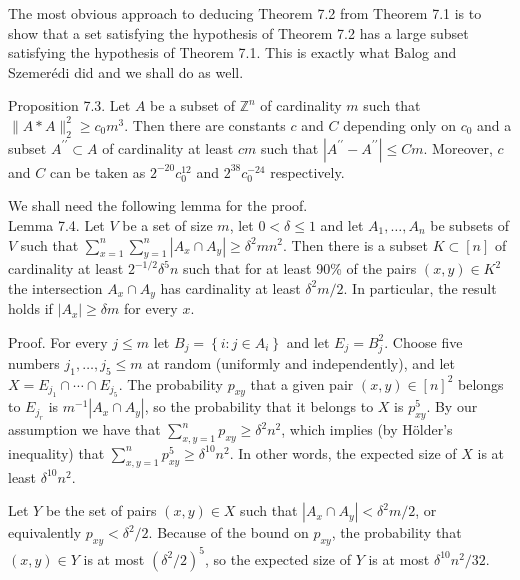 \documentclass[10pt]{article}
\begin{document}
The most obvious approach to deducing Theorem 7.2 from Theorem 7.1 is to show that a set satisfying the hypothesis of Theorem 7.2 has a large subset satisfying the hypothesis of Theorem 7.1. This is exactly what Balog and Szemerédi did and we shall do as well.

Proposition 7.3. Let $A$ be a subset of $\mathbb{Z}^{n}$ of cardinality $m$ such that $\|A * A\|_{2}^{2} \geqslant c_{0} m^{3}$. Then there are constants $c$ and $C$ depending only on $c_{0}$ and a subset $A^{\prime \prime} \subset A$ of cardinality at least $c m$ such that $\left|A^{\prime \prime}-A^{\prime \prime}\right| \leqslant C m$. Moreover, $c$ and $C$ can be taken as $2^{-20} c_{0}^{12}$ and $2^{38} c_{0}^{-24}$ respectively.

We shall need the following lemma for the proof.\\
Lemma 7.4. Let $V$ be a set of size $m$, let $0<\delta\leq 1$ and let $A_{1}, \ldots, A_{n}$ be subsets of $V$ such that $\sum_{x=1}^{n} \sum_{y=1}^{n}\left|A_{x} \cap A_{y}\right| \geqslant \delta^{2} m n^{2}$. Then there is a subset $K \subset[n]$ of cardinality at least $2^{-1 / 2} \delta^{5} n$ such that for at least 90\% of the pairs $(x, y) \in K^{2}$ the intersection $A_{x} \cap A_{y}$ has cardinality at least $\delta^{2} m / 2$. In particular, the result holds if $\left|A_{x}\right| \geqslant \delta m$ for every $x$.

Proof. For every $j \leqslant m$ let $B_{j}=\left\{i: j \in A_{i}\right\}$ and let $E_{j}=B_{j}^{2}$. Choose five numbers $j_{1}, \ldots, j_{5} \leqslant m$ at random (uniformly and independently), and let $X=E_{j_{1}} \cap \cdots \cap E_{j_{5}}$. The probability $p_{x y}$ that a given pair $(x, y) \in[n]^{2}$ belongs to $E_{j_{r}}$ is $m^{-1}\left|A_{x} \cap A_{y}\right|$, so the probability that it belongs to $X$ is $p_{x y}^{5}$. By our assumption we have that $\sum_{x, y=1}^{n} p_{x y} \geqslant \delta^{2} n^{2}$, which implies (by Hölder's inequality) that $\sum_{x, y=1}^{n} p_{x y}^{5} \geqslant \delta^{10} n^{2}$. In other words, the expected size of $X$ is at least $\delta^{10} n^{2}$.

Let $Y$ be the set of pairs $(x, y) \in X$ such that $\left|A_{x} \cap A_{y}\right|<\delta^{2} m / 2$, or equivalently $p_{x y}<\delta^{2} / 2$. Because of the bound on $p_{x y}$, the probability that $(x, y) \in Y$ is at most $\left(\delta^{2} / 2\right)^{5}$, so the expected size of $Y$ is at most $\delta^{10} n^{2} / 32$.
\end{document}

